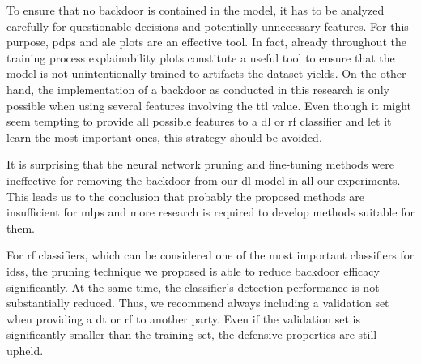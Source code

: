 \documentclass[10pt,sigconf,letterpaper,dvipsnames]{acmart}
\begin{document}
To ensure that no backdoor is contained in the model,
it has to be  analyzed carefully for questionable decisions and potentially unnecessary features. For this purpose, \glspl{pdp} and \gls{ale} plots are an effective tool. In fact, already throughout the training process explainability plots constitute a useful tool to ensure that the model is not unintentionally trained  to artifacts the dataset yields.
On the other hand, the implementation of a backdoor as conducted in this research is only possible when using several features involving the \gls{ttl} value. Even though it might seem tempting to provide all possible features to a \gls{dl} or \gls{rf} classifier and let it learn the most important ones, this strategy should be avoided.

It is surprising that the neural network pruning and fine-tuning methods were ineffective for removing the backdoor from our \gls{dl} model in all our experiments. This leads us to the conclusion that probably the proposed methods are insufficient for \glspl{mlp} and more research is required to develop methods suitable for them.

For \gls{rf} classifiers, which can be considered one of the most important classifiers for \glspl{ids}, the pruning technique we proposed is able to reduce backdoor efficacy significantly. At the same time, the classifier's detection performance is not substantially reduced. Thus, we recommend always including a validation set when providing a \gls{dt} or \gls{rf} to another party. Even if the validation set is significantly smaller than the training set, the defensive properties are still upheld. 

%
%
%
\end{document}

